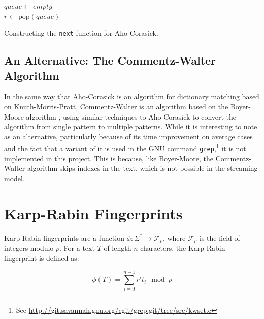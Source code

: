 \documentclass[ %
                    author={Dominic Joseph Moylett},
                    degree={MEng},
                     title={Dictionary Matching with Fingerprints},
                  subtitle={An Empirical Analysis},
                      type={research},
                      year={2015} ]{dissertation}
\begin{document}
\begin{algorithm}[t]
$queue \gets empty$\\
 {
  $r \gets \text{pop}(queue)$\\
}
\caption{Constructing the \texttt{next} function for Aho-Corasick.}
\label{alg:ac-next}
\end{algorithm}

\subsection{An Alternative: The Commentz-Walter Algorithm}

In the same way that Aho-Corasick is an algorithm for dictionary matching based on Knuth-Morris-Pratt, Commentz-Walter \cite{commentz-walter:algo} is an algorithm based on the Boyer-Moore algorithm \cite{Boyer:1977:FSS:359842.359859}, using similar techniques to Aho-Corasick to convert the algorithm from single pattern to multiple patterns. While it is interesting to note as an alternative, particularly because of its time improvement on average cases and the fact that a variant of it is used in the GNU command \texttt{grep},\footnote{See \url{http://git.savannah.gnu.org/cgit/grep.git/tree/src/kwset.c}} it is not implemented in this project. This is because, like Boyer-Moore, the Commentz-Walter algorithm skips indexes in the text, which is not possible in the streaming model.

\section{Karp-Rabin Fingerprints}
\label{sec:kr-fingerprints}

Karp-Rabin fingerprints \cite{5390135} are a function $\phi : \Sigma^* \to \mathcal{F}_p$, where $\mathcal{F}_p$ is the field of integers modulo $p$. For a text $T$ of length $n$ characters, the Karp-Rabin fingerprint is defined as:

$$\phi(T) = \sum_{i = 0}^{n - 1} r^it_i \mod p$$
\end{document}
